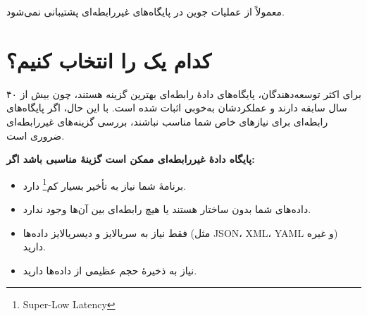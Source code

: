 \documentclass[12pt,a4paper]{article}
\begin{document}
معمولاً از عملیات جوین در پایگاه‌های غیررابطه‌ای پشتیبانی نمی‌شود.

\section{کدام یک را انتخاب کنیم؟}

برای اکثر توسعه‌دهندگان، پایگاه‌های دادهٔ رابطه‌ای بهترین گزینه هستند، چون بیش از ۴۰ سال سابقه دارند و عملکردشان به‌خوبی اثبات شده است. با این حال، اگر پایگاه‌های رابطه‌ای برای نیازهای خاص شما مناسب نباشند، بررسی گزینه‌های غیررابطه‌ای ضروری است.

\textbf{پایگاه دادهٔ غیررابطه‌ای ممکن است گزینهٔ مناسبی باشد اگر:}

\begin{itemize}
\item برنامهٔ شما نیاز به تأخیر بسیار کم\footnote{Super-Low Latency} دارد.
\item داده‌های شما بدون ساختار هستند یا هیچ رابطه‌ای بین آن‌ها وجود ندارد.
\item فقط نیاز به سریالایز و دیسریالایز داده‌ها (مثل JSON، XML، YAML و غیره) دارید.
\item نیاز به ذخیرهٔ حجم عظیمی از داده‌ها دارید.
\end{itemize}
\end{document}
